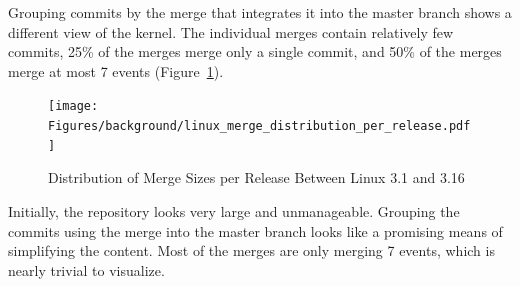 Grouping commits by the merge that integrates it into the master branch
shows a different view of the kernel. The individual merges contain
relatively few commits, 25\% of the merges merge only a single commit,
and 50\% of the merges merge at most 7 events
(Figure~\ref{fig:linux_merge_distribution_per_release}).

\begin{figure}[htpb]
  \centering
  \texttt{[image: Figures/background/linux\_merge\_distribution\_per\_release.pdf]}
  \caption{Distribution of Merge Sizes per Release Between Linux 3.1 and
  3.16}
  \label{fig:linux_merge_distribution_per_release}
\end{figure}

Initially, the repository looks very large and unmanageable. Grouping
the commits using the merge into the master branch looks like a
promising means of simplifying the content. Most of the merges are only
merging 7 events, which is nearly trivial to visualize.
